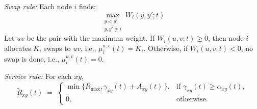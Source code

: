 \documentclass[11pt]{article}
\newcommand{\E}{\mathbb{E}}
\begin{document}

\textit{Swap rule:} 
 Each node $i$ finds:
\begin{equation}
\max_{\substack{y<y'\\ y,y'\neq i}}
W_i(y,y';t)
\label{eq:nodeILP-detailed}
\end{equation}
Let $uv$ be the pair with the maximum weight. If $W_i(u,v;t)\geq 0$, then node $i$ allocates $K_i$ swaps to  $uv$, i.e., $\mu_i^{u,v}(t)=K_i$. Otherwise, 
if $W_i(u,v;t)<0$, no swap is done, i.e., $\mu_i^{u,v}(t)=0$. 

\textit{Service rule:} For each $xy$, 
\begin{equation}
\tilde{R}_{xy}(t)\;=\;
\begin{cases}
\min\!\big\{R_{\max}, \gamma_{xy}(t)+A_{xy}(t)\,\big\},
&\text{if }\gamma_{xy}(t)\ge \alpha_{xy}(t),\\[4pt]
0, &\text{otherwise.}
\end{cases}
\label{eq:Rrule-detailed}
\end{equation}






\end{document}
